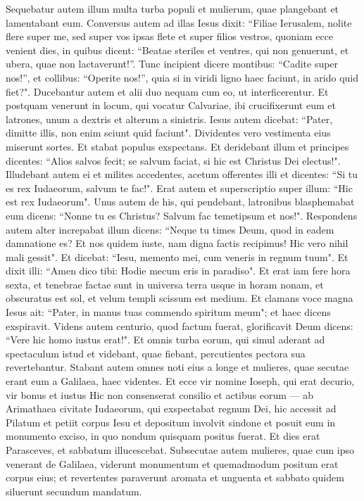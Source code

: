 \begin{biblechapter}
\verse Sequebatur autem illum multa turba populi et mulierum, quae plangebant et lamentabant eum. 
\verse Conversus autem ad illas Iesus dixit: “Filiae Ierusalem, nolite flere super me, sed super vos ipsas flete et super filios vestros, 
\verse quoniam ecce venient dies, in quibus dicent: “Beatae steriles et ventres, qui non genuerunt, et ubera, quae non lactaverunt!”. 
\verse Tunc incipient dicere montibus: “Cadite super nos!”, et collibus: “Operite nos!”, 
\verse quia si in viridi ligno haec faciunt, in arido quid fiet?". 
\verse Ducebantur autem et alii duo nequam cum eo, ut interficerentur. 
\verse Et postquam venerunt in locum, qui vocatur Calvariae, ibi crucifixerunt eum et latrones, unum a dextris et alterum a sinistris. 
\verse Iesus autem dicebat: “Pater, dimitte illis, non enim sciunt quid faciunt". Dividentes vero vestimenta eius miserunt sortes. 
\verse Et stabat populus exspectans. Et deridebant illum et principes dicentes: “Alios salvos fecit; se salvum faciat, si hic est Christus Dei electus!". 
\verse Illudebant autem ei et milites accedentes, acetum offerentes illi 
\verse et dicentes: “Si tu es rex Iudaeorum, salvum te fac!". 
\verse Erat autem et superscriptio super illum: “Hic est rex Iudaeorum". 
\verse Unus autem de his, qui pendebant, latronibus blasphemabat eum dicens: “Nonne tu es Christus? Salvum fac temetipsum et nos!". 
\verse Respondens autem alter increpabat illum dicens: “Neque tu times Deum, quod in eadem damnatione es?  
\verse Et nos quidem iuste, nam digna factis recipimus! Hic vero nihil mali gessit". 
\verse Et dicebat: “Iesu, memento mei, cum veneris in regnum tuum". 
\verse Et dixit illi: “Amen dico tibi: Hodie mecum eris in paradiso". 
\verse Et erat iam fere hora sexta, et tenebrae factae sunt in universa terra usque in horam nonam, 
\verse et obscuratus est sol, et velum templi scissum est medium. 
\verse Et clamans voce magna Iesus ait: “Pater, in manus tuas commendo spiritum meum"; et haec dicens exspiravit. 
\verse Videns autem centurio, quod factum fuerat, glorificavit Deum dicens: “Vere hic homo iustus erat!". 
\verse Et omnis turba eorum, qui simul aderant ad spectaculum istud et videbant, quae fiebant, percutientes pectora sua revertebantur. 
\verse Stabant autem omnes noti eius a longe et mulieres, quae secutae erant eum a Galilaea, haec videntes. 
\verse Et ecce vir nomine Ioseph, qui erat decurio, vir bonus et iustus 
\verse Hic non consenserat consilio et actibus eorum — ab Arimathaea civitate Iudaeorum, qui exspectabat regnum Dei, 
\verse hic accessit ad Pilatum et petiit corpus Iesu  
\verse et depositum involvit sindone et posuit eum in monumento exciso, in quo nondum quisquam positus fuerat. 
\verse Et dies erat Parasceves, et sabbatum illucescebat. 
\verse Subsecutae autem mulieres, quae cum ipso venerant de Galilaea, viderunt monumentum et quemadmodum positum erat corpus eius; 
\verse et revertentes paraverunt aromata et unguenta et sabbato quidem siluerunt secundum mandatum. 
\end{biblechapter}

